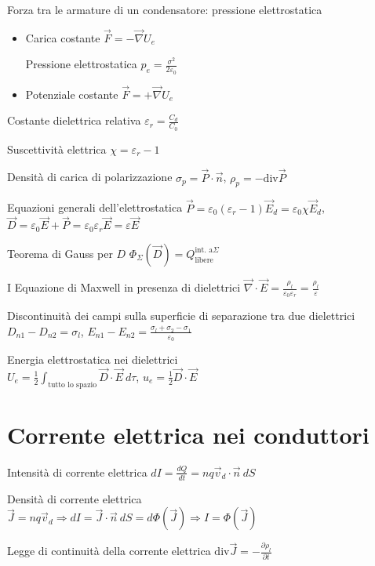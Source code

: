 \documentclass[8pt,a4paper]{article}
\numberwithin{equation}{subsection}
\begin{document}
\begin{multicols}{2}
Forza tra le armature di un condensatore: pressione elettrostatica
\begin{itemize}
\item Carica costante $\vec{F} =-\vec{\nabla } U_{e}$

Pressione elettrostatica $p_{e} =\frac{\sigma ^{2}}{2\varepsilon _{0}}$
\item Potenziale costante $\vec{F} =+\vec{\nabla } U_{e}$
\end{itemize}

Costante dielettrica relativa $\varepsilon _{r} =\frac{C_{d}}{C_{0}}$

Suscettività elettrica $\chi =\varepsilon _{r} -1$

Densità di carica di polarizzazione $\sigma _{p} =\vec{P} \cdot \vec{n}$, $\rho _{p} =-\text{div}\vec{P}$

Equazioni generali dell'elettrostatica $\vec{P} =\varepsilon _{0} (\varepsilon _{r} -1)\vec{E}_{d} =\varepsilon _{0} \chi \vec{E}_{d}$, $\vec{D} =\varepsilon _{0}\vec{E} +\vec{P} =\varepsilon _{0} \varepsilon _{r}\vec{E} =\varepsilon \vec{E}$

Teorema di Gauss per $D$ $\Phi _{\Sigma } (\vec{D} )=Q^{\text{int. a} \Sigma }_{\text{libere}}$

I Equazione di Maxwell in presenza di dielettrici $\vec{\nabla } \cdot \vec{E} =\frac{\rho _{l}}{\varepsilon _{0} \varepsilon _{r}} =\frac{\rho _{l}}{\varepsilon }$

Discontinuità dei campi sulla superficie di separazione tra due dielettrici $D_{n1} -D_{n2} =\sigma _{l}$, $E_{n1} -E_{n2} =\frac{\sigma _{l} +\sigma _{2} -\sigma _{1}}{\varepsilon _{0}}$

Energia elettrostatica nei dielettrici \\$U_{e} =\frac{1}{2}\int _{\text{tutto lo spazio}}\vec{D} \cdot \vec{E} \ d\tau $, $u_{e} =\frac{1}{2}\vec{D} \cdot \vec{E}$
\section*{Corrente elettrica nei conduttori}

Intensità di corrente elettrica $dI=\frac{dQ}{dt} =nq\vec{v}_{d} \cdot \vec{n} \ dS$

Densità di corrente elettrica \\$\vec{J} =nq\vec{v}_{d} \Longrightarrow dI=\vec{J} \cdot \vec{n} \ dS=d\Phi (\vec{J} )\Rightarrow I=\Phi (\vec{J} )$

Legge di continuità della corrente elettrica $\text{div}\vec{J} =-\frac{\partial \rho _{l}}{\partial t}$


\end{multicols}
\end{document}
